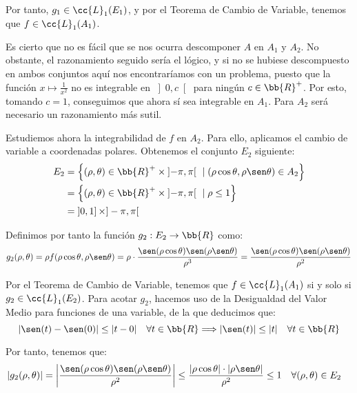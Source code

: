 \begin{ejercicio}
\begin{enumerate}
        Por tanto, $g_1\in \cc{L}_1(E_1)$, y por el Teorema de Cambio de Variable, tenemos que $f\in \cc{L}_1(A_1)$.
        \begin{observacion}
            Es cierto que no es fácil que se nos ocurra descomponer $A$ en $A_1$ y $A_2$. No obstante,
            el razonamiento seguido sería el lógico, y si no se hubiese descompuesto en ambos conjuntos aquí nos encontraríamos
            con un problema, puesto que la función $x\mapsto \frac{1}{x^2}$ no es integrable en $\left]0,c\right[$ para ningún $c\in \bb{R}^+$.
            Por esto, tomando $c=1$, conseguimos que ahora sí sea integrable en $A_1$. Para $A_2$ será necesario un razonamiento más sutil.
        \end{observacion}

        Estudiemos ahora la integrabilidad de $f$ en $A_2$. Para ello, aplicamos el cambio de variable a coordenadas polares. Obtenemos el conjunto $E_2$ siguiente:
        \begin{align*}
            E_2 &= \left\{ (\rho, \theta) \in \bb{R}^+\times \left]-\pi, \pi\right[ ~\mid (\rho\cos\theta, \rho\sen\theta) \in A_2 \right\} \\
            &= \left\{ (\rho, \theta) \in \bb{R}^+\times \left]-\pi, \pi\right[ ~\mid \rho \leq 1 \right\} \\
            &= \left]0,1\right]\times ]-\pi, \pi[
        \end{align*}

        Definimos por tanto la función $g_2: E_2 \to \bb{R}$ como:
        \begin{equation*}
            g_2(\rho, \theta) = \rho f(\rho\cos\theta, \rho\sen\theta) = \rho\cdot \frac{\sen(\rho\cos\theta) \sen(\rho\sen\theta)}{\rho^3}
            = \frac{\sen(\rho\cos\theta) \sen(\rho\sen\theta)}{\rho^2}
        \end{equation*}

        Por el Teorema de Cambio de Variable, tenemos que $f\in \cc{L}_1(A_1)$ si y solo si $g_2\in \cc{L}_1(E_2)$. Para acotar $g_2$,
        hacemos uso de la Desigualdad del Valor Medio para funciones de una variable, de la que deducimos que:
        \begin{equation*}
            |\sen(t) - \sen(0)| \leq |t-0| \quad \forall t\in \bb{R} \Longrightarrow |\sen(t)| \leq |t| \quad \forall t\in \bb{R}
        \end{equation*}

        Por tanto, tenemos que:
        \begin{align*}
            |g_2(\rho, \theta)| &= \left| \frac{\sen(\rho\cos\theta) \sen(\rho\sen\theta)}{\rho^2} \right|
            \leq \frac{|\rho\cos\theta| \cdot |\rho\sen\theta|}{\rho^2}
            \leq 1 \quad \forall (\rho, \theta) \in E_2
        \end{align*}


\end{enumerate}
\end{ejercicio}
